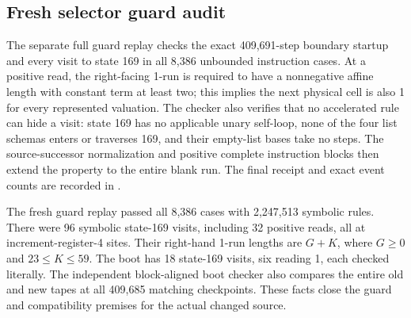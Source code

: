 \subsection{Fresh selector guard audit}
The separate full guard replay checks the exact 409,691-step boundary startup and every visit to state 169 in all 8,386 unbounded instruction cases. At a positive read, the right-facing 1-run is required to have a nonnegative affine length with constant term at least two; this implies the next physical cell is also 1 for every represented valuation. The checker also verifies that no accelerated rule can hide a visit: state 169 has no applicable unary self-loop, none of the four list schemas enters or traverses 169, and their empty-list bases take no steps. The source-successor normalization and positive complete instruction blocks then extend the property to the entire blank run. The final receipt and exact event counts are recorded in .

The fresh guard replay passed all 8,386 cases with 2,247,513 symbolic rules. There were 96 symbolic state-169 visits, including 32 positive reads, all at increment-register-4 sites. Their right-hand 1-run lengths are $G+K$, where $G\geq0$ and $23\leq K\leq59$. The boot has 18 state-169 visits, six reading 1, each checked literally. The independent block-aligned boot checker also compares the entire old and new tapes at all 409,685 matching checkpoints. These facts close the guard and compatibility premises for the actual changed source.
